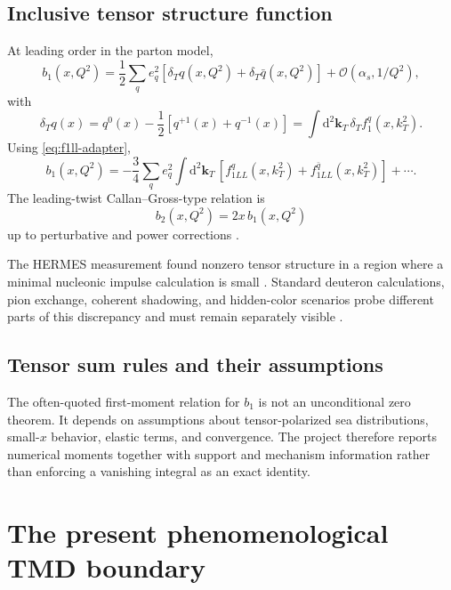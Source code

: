 \documentclass[11pt,oneside]{book}
\newcommand{\kT}{\bm{k}_{T}}
\newcommand{\dd}{\mathrm{d}}
\newcommand{\cO}{\mathcal{O}}
\begin{document}
\section{Inclusive tensor structure function}

At leading order in the parton model,
\begin{equation}
 b_1(x,Q^2)
 =\frac12\sum_q e_q^2
 \left[\delta_T q(x,Q^2)+\delta_T\bar q(x,Q^2)\right]
 +\cO(\alpha_s,1/Q^2),
 \label{eq:b1}
\end{equation}
with
\begin{equation}
 \delta_Tq(x)=q^{0}(x)-\frac12[q^{+1}(x)+q^{-1}(x)]
 =\int\dd^2\kT\,\delta_Tf_1^q(x,k_T^2).
 \label{eq:deltaTq}
\end{equation}
Using \cref{eq:f1ll-adapter},
\begin{equation}
 b_1(x,Q^2)
 =-\frac34\sum_qe_q^2
 \int\dd^2\kT\,
 \left[f_{1LL}^q(x,k_T^2)+f_{1LL}^{\bar q}(x,k_T^2)\right]
 +\cdots.
 \label{eq:b1-f1ll}
\end{equation}
The leading-twist Callan--Gross-type relation is
\begin{equation}
 b_2(x,Q^2)=2x\,b_1(x,Q^2)
 \label{eq:b2}
\end{equation}
up to perturbative and power corrections \cite{HoodbhoyJaffeManohar1989,JaffeManohar1989}.

The HERMES measurement found nonzero tensor structure in a region where a minimal nucleonic impulse calculation is small \cite{HERMES2005b1}.  Standard deuteron calculations, pion exchange, coherent shadowing, and hidden-color scenarios probe different parts of this discrepancy and must remain separately visible \cite{CosynDongKumanoSargsian2017,Miller2014b1}.

\section{Tensor sum rules and their assumptions}

The often-quoted first-moment relation for $b_1$ is not an unconditional zero theorem.  It depends on assumptions about tensor-polarized sea distributions, small-$x$ behavior, elastic terms, and convergence.  The project therefore reports numerical moments together with support and mechanism information rather than enforcing a vanishing integral as an exact identity.

\chapter{The present phenomenological TMD boundary}
\label{chap:phenomenology}
\end{document}
